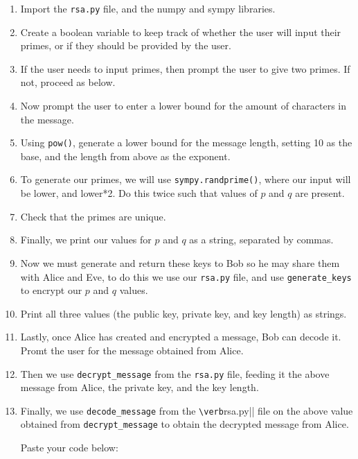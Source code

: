 \documentclass{article}
\begin{document}
    \begin{enumerate}
        \item Import the \verb|rsa.py| file, and the numpy and sympy libraries.

        \item Create a boolean variable to keep track of whether the user will input their primes, or if they should be provided by the user.

        \item If the user needs to input primes, then prompt the user to give two primes. If not, proceed as below.

        \item Now prompt the user to enter a lower bound for the amount of characters in the message.

        \item Using \verb|pow()|, generate a lower bound for the message length, setting 10 as the base, and the length from above as the exponent.

        \item To generate our primes, we will use \verb|sympy.randprime()|, where our input will be lower, and lower*2. Do this twice such that values of $p$ and $q$ are present.

        \item Check that the primes are unique.

        \item Finally, we print our values for $p$ and $q$ as a string, separated by commas.

        \item Now we must generate and return these keys to Bob so he may share them with Alice and Eve, to do this we use our \verb|rsa.py| file, and use \verb|generate_keys| to encrypt our $p$ and $q$ values.

        \item Print all three values (the public key, private key, and key length) as strings.

        \item Lastly, once Alice has created and encrypted a message, Bob can decode it. Promt the user for the message obtained from Alice.

        \item Then we use \verb|decrypt_message| from the \verb|rsa.py| file, feeding it the above message from Alice, the private key, and the key length.

        \item Finally, we use \verb|decode_message| from the \verb|\verb|rsa.py|| file on the above value obtained from \verb|decrypt_message| to obtain the decrypted message from Alice.

        Paste your code below:

            \TextField[width=6in,height=5in, bordercolor=0 0 0, name=bob2, multiline=true]{}
    \end{enumerate}
\end{document}
